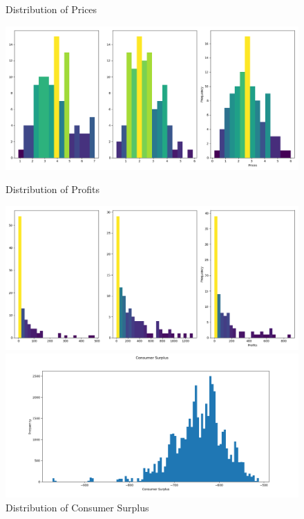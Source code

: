 \documentclass{article}
\begin{document}
\begin{figure}[h]
  \caption{Distribution of Prices}
  \centering
    \includegraphics[width=1.0\textwidth]{fig_hist_prices3_t}
  \caption{Distribution of Profits}
  \centering
    \includegraphics[width=1.0\textwidth]{fig_hist_profits3_t}
  \caption{Distribution of Consumer Surplus}
  \centering
    \includegraphics[width=1.0\textwidth]{fig_hist_consumersurplus3_t}
\end{figure}
\FloatBarrier
\end{document}
